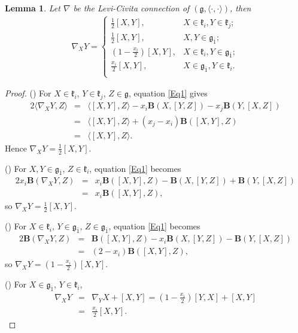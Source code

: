\documentclass[reqno]{amsart}
\newtheorem{lem}[thm]{Lemma}
\theoremstyle{definition}
\begin{document}
\begin{lem}\label{3-lem-levi-civita}
Let $\nabla$ be the Levi-Civita connection of $(\mathfrak{g},\langle\cdot,\cdot\rangle)$, then
\begin{eqnarray*}
\nabla_{X}Y=
\begin{cases}
\frac{1}{2}[X,Y],            &X\in\mathfrak{k}_{i},Y\in\mathfrak{k}_{j};\\
\frac{1}{2}[X,Y],            &X,Y\in\mathfrak{g}_{\bar{1}};\\
\left(1-\frac{x_{i}}{2}\right)[X,Y],    &X\in\mathfrak{k}_{i},Y\in\mathfrak{g}_{\bar{1}};\\
\frac{x_{i}}{2}[X,Y],        &X\in\mathfrak{g}_{\bar{1}},Y\in\mathfrak{k}_{i}.\\
\end{cases}
\end{eqnarray*}
\end{lem}
\begin{proof}
() For  $X\in\mathfrak{k}_{i}$, $Y\in\mathfrak{k}_{j}$, $Z\in\mathfrak{g}$, equation \eqref{Eq1} gives
\begin{eqnarray*}
2\langle\nabla_{X}Y,Z\rangle&=&\langle[X,Y],Z\rangle-x_{i}\mathbf{B}(X,[Y,Z])-x_{j}\mathbf{B}(Y,[X,Z])\\
                            &=&\langle[X,Y],Z\rangle+(x_{j}-x_{i})\mathbf{B}([X,Y],Z)\\
                            &=&\langle[X,Y],Z\rangle.
\end{eqnarray*}
Hence $\nabla_{X}Y=\frac{1}{2}[X,Y]$.

() For  $X,Y\in\mathfrak{g}_{\bar{1}}$, $Z\in\mathfrak{k}_{i}$, equation \eqref{Eq1} becomes
\begin{eqnarray*}
2x_{i}\mathbf{B}(\nabla_{X}Y,Z)&=&x_{i}\mathbf{B}([X,Y],Z)-\mathbf{B}(X,[Y,Z])+\mathbf{B}(Y,[X,Z])\\
                               &=&x_{i}\mathbf{B}([X,Y],Z),
\end{eqnarray*}
so $\nabla_{X}Y=\frac{1}{2}[X,Y]$.

() For  $X\in\mathfrak{k}_{i}$, $Y\in\mathfrak{g}_{\bar{1}}$, $Z\in\mathfrak{g}_{\bar{1}}$, equation \eqref{Eq1} becomes
\begin{eqnarray*}
2\mathbf{B}(\nabla_{X}Y,Z)&=&\mathbf{B}([X,Y],Z)-x_{i}\mathbf{B}(X,[Y,Z])-\mathbf{B}(Y,[X,Z])\\
                               &=&(2-x_{i})\mathbf{B}([X,Y],Z),
\end{eqnarray*}
so $\nabla_{X}Y=\left(1-\frac{x_{i}}{2}\right)[X,Y]$.

() For  $X\in\mathfrak{g}_{\bar{1}}$, $Y\in\mathfrak{k}_{i}$,
\begin{eqnarray*}
\nabla_{X}Y&=&\nabla_{Y}X+[X,Y]=\left(1-\frac{x_{i}}{2}\right)[Y,X]+[X,Y]\\
           &=&\frac{x_{i}}{2}[X,Y].
\end{eqnarray*}
\end{proof}
\end{document}
